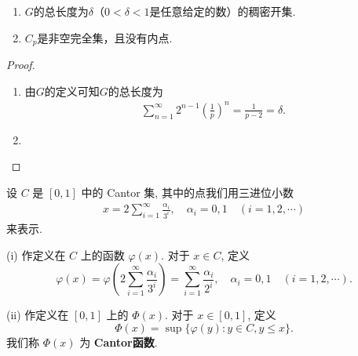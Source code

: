 \documentclass[../../main.tex]{subfiles}%
\begin{document}
\begin{theorem}[类Cantor集的基本性质]\label{theorem:类Cantor集的基本性质}
\begin{enumerate}[(1)]
\item $G$的总长度为$\delta$（$0<\delta<1$是任意给定的数）的稠密开集.

\item $C_p$是非空完全集，且没有内点.
\end{enumerate}
\end{theorem}
\begin{proof}
\begin{enumerate}[(1)]
\item 由$G$的定义可知$G$的总长度为
\begin{align*}
\sum_{n = 1}^{\infty}2^{n - 1}\left(\frac{1}{p}\right)^n=\frac{1}{p - 2}=\delta.
\end{align*}

\item 
\end{enumerate}
\end{proof}

\begin{definition}[Cantor函数]\label{definition:Cantor函数}
设 \(C\) 是 \([0,1]\) 中的 Cantor 集, 其中的点我们用三进位小数
\begin{align*}
x = 2\sum_{i = 1}^{\infty}\frac{\alpha_i}{3^i}, \quad \alpha_i = 0,1 \quad (i = 1,2,\cdots)
\end{align*}
来表示.

(i) 作定义在 \(C\) 上的函数 \(\varphi(x)\). 对于 \(x \in C\), 定义
\[
\varphi(x)=\varphi\left(2\sum_{i = 1}^{\infty}\frac{\alpha_i}{3^i}\right)=\sum_{i = 1}^{\infty}\frac{\alpha_i}{2^i}, \quad \alpha_i = 0,1 \quad (i = 1,2,\cdots).
\]

(ii) 作定义在 \([0,1]\) 上的 \(\varPhi(x)\). 对于 \(x \in [0,1]\), 定义
\[
\varPhi(x)=\sup\{\varphi(y):y\in C,y\leqslant x\}.
\]
我们称 \(\varPhi(x)\) 为 \textbf{Cantor函数}.
\end{definition}
\end{document}
